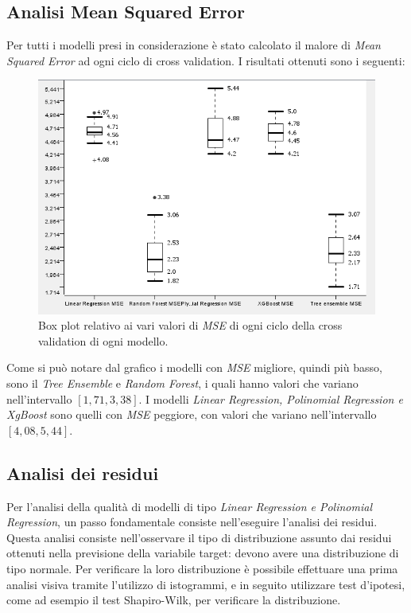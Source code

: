 \documentclass[12pt, a4paper, twocolumn]{article} %
\begin{document}
\subsection{Analisi Mean Squared Error}
Per tutti i modelli presi in considerazione è stato calcolato il malore di \textit{Mean Squared Error} ad ogni ciclo di cross validation.
I risultati ottenuti sono i seguenti:
\begin{figure}[H]
  \includegraphics[scale=0.5]{./Immagini/boxplot-mse.png}
  \caption{Box plot relativo ai vari valori di \textit{MSE} di ogni ciclo della cross validation di ogni modello.}
\end{figure}
Come si può notare dal grafico i modelli con \textit{MSE} migliore, quindi più basso, sono il \textit{Tree Ensemble} e \textit{Random Forest}, i quali hanno valori che variano nell'intervallo $[1,71, 3,38]$. I modelli \textit{Linear Regression, Polinomial Regression e XgBoost} sono quelli con \textit{MSE} peggiore, con valori che variano nell'intervallo $[4,08 , 5,44]$.
\subsection{Analisi dei residui}
Per l'analisi della qualità di modelli di tipo \textit{Linear Regression e Polinomial Regression}, un passo fondamentale consiste nell'eseguire l'analisi dei residui. Questa analisi consiste nell'osservare il tipo di distribuzione assunto dai residui ottenuti nella previsione della variabile target: devono avere una distribuzione di tipo normale.
Per verificare la loro distribuzione è possibile effettuare una prima analisi visiva tramite l'utilizzo di istogrammi, e in seguito utilizzare test d'ipotesi, come ad esempio il test Shapiro-Wilk, per verificare la distribuzione.
\end{document}
